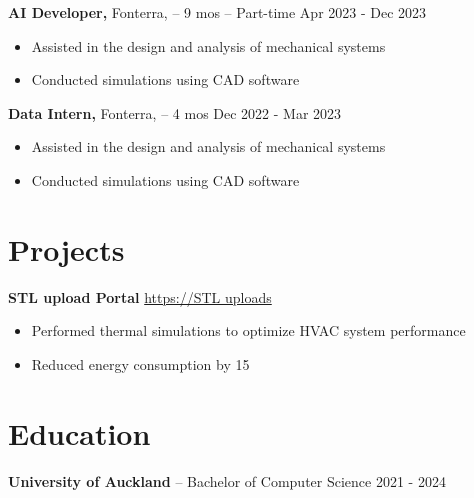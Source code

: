 \documentclass[11pt]{article}       %
\begin{document}
\textbf{AI Developer,} {Fonterra,} -- 9 mos -- Part-time \hfill Apr 2023 - Dec 2023 \\
\vspace{-9pt}
\begin{itemize}
    
        \item Assisted in the design and analysis of mechanical systems
    
        \item Conducted simulations using CAD software
    
\end{itemize}

\textbf{Data Intern,} {Fonterra,} -- 4 mos \hfill Dec 2022 - Mar 2023 \\
\vspace{-9pt}
\begin{itemize}
    
        \item Assisted in the design and analysis of mechanical systems
    
        \item Conducted simulations using CAD software
    
\end{itemize}


\vspace{-18.5pt}

\section*{Projects}

\textbf{STL upload Portal} \hfill \href{https://STL uploads}{https://STL uploads} \\
\vspace{-9pt}
\begin{itemize}
    
        \item Performed thermal simulations to optimize HVAC system performance
    
        \item Reduced energy consumption by 15%
    \end{itemize}


\vspace{-18.5pt}

\section*{Education}

\textbf{University of Auckland} -- Bachelor of Computer Science \hfill 2021 - 2024 \\
\end{document}
